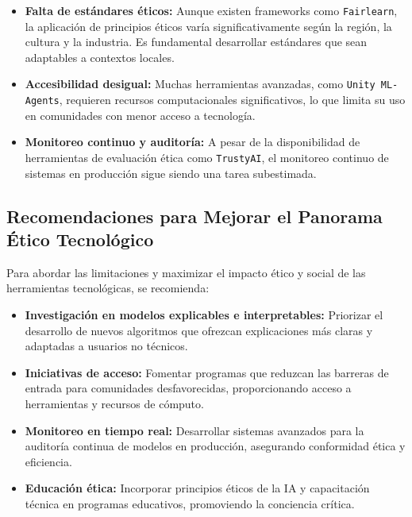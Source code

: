 \begin{refsection}
\begin{itemize}
    \item \textbf{Falta de estándares éticos:}  
    Aunque existen frameworks como \texttt{Fairlearn}, la aplicación de principios éticos varía significativamente según la región, la cultura y la industria. Es fundamental desarrollar estándares que sean adaptables a contextos locales.

    \item \textbf{Accesibilidad desigual:}  
    Muchas herramientas avanzadas, como \texttt{Unity ML-Agents}, requieren recursos computacionales significativos, lo que limita su uso en comunidades con menor acceso a tecnología.

    \item \textbf{Monitoreo continuo y auditoría:}  
    A pesar de la disponibilidad de herramientas de evaluación ética como \texttt{TrustyAI}, el monitoreo continuo de sistemas en producción sigue siendo una tarea subestimada.
\end{itemize}

\subsection{Recomendaciones para Mejorar el Panorama Ético Tecnológico}

Para abordar las limitaciones y maximizar el impacto ético y social de las herramientas tecnológicas, se recomienda:

\begin{itemize}

    \item \textbf{Investigación en modelos explicables e interpretables:}  
    Priorizar el desarrollo de nuevos algoritmos que ofrezcan explicaciones más claras y adaptadas a usuarios no técnicos.

    \item \textbf{Iniciativas de acceso:}  
    Fomentar programas que reduzcan las barreras de entrada para comunidades desfavorecidas, proporcionando acceso a herramientas y recursos de cómputo.

    \item \textbf{Monitoreo en tiempo real:}  
    Desarrollar sistemas avanzados para la auditoría continua de modelos en producción, asegurando conformidad ética y eficiencia.

    \item \textbf{Educación ética:}  
    Incorporar principios éticos de la IA y capacitación técnica en programas educativos, promoviendo la conciencia crítica.


\end{itemize}
\end{refsection}
